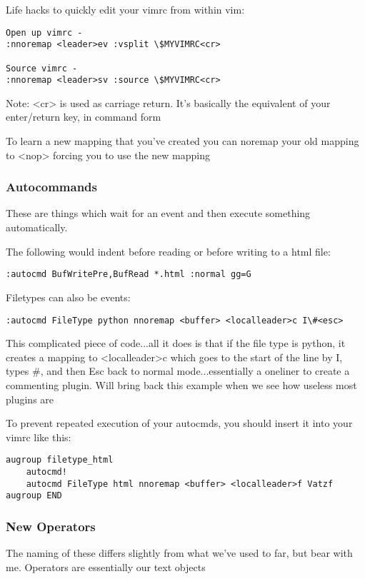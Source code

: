 \documentclass[12pt, letterpaper]{article}
\begin{document}
Life hacks to quickly edit your vimrc from within vim:

\begin{verbatim}
Open up vimrc - 
:nnoremap <leader>ev :vsplit \$MYVIMRC<cr>

Source vimrc - 
:nnoremap <leader>sv :source \$MYVIMRC<cr>
\end{verbatim}

Note: <cr> is used as carriage return. It's basically the equivalent of your enter/return key, in command form

To learn a new mapping that you've created you can noremap your old mapping to <nop>  forcing you to use the new mapping

\subsubsection{Autocommands}
These are things which wait for an event and then execute something automatically. 

The following would indent before reading or before writing to a html file: 
\begin{verbatim}
:autocmd BufWritePre,BufRead *.html :normal gg=G
\end{verbatim}

Filetypes can also be events:
\begin{verbatim}
:autocmd FileType python nnoremap <buffer> <localleader>c I\#<esc>
\end{verbatim}

This complicated piece of code...all it does is that if the file type is python, it creates a mapping to <localleader>c which goes to the start of the line by I, types \#, and then Esc back to normal mode...essentially a oneliner to create a commenting plugin. Will bring back this example when we see how useless most plugins are


To prevent repeated execution of your autocmds, you should insert it into your vimrc like this:
\begin{verbatim}
augroup filetype_html
    autocmd!
    autocmd FileType html nnoremap <buffer> <localleader>f Vatzf
augroup END
\end{verbatim}

\subsubsection{New Operators}
The naming of these differs slightly from what we've used to far, but bear with me. Operators are essentially our text objects
\end{document}
